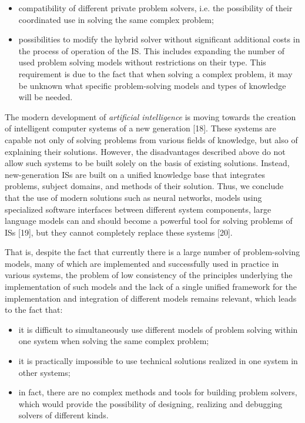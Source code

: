 \documentclass[10pt, a4paper]{article}
\begin{document}
\begin{multicols}{2}
\begin{itemize}
 \setlength{\baselineskip}{0.9\baselineskip}
     \item  compatibility of different private problem solvers, i.e. the possibility of their coordinated use in solving the same complex problem;
     \item possibilities to modify the hybrid solver without significant additional costs in the process of operation of the IS. This includes expanding the number of used problem solving models without restrictions on their type. This requirement is due to the fact that when solving a complex problem, it may be unknown what specific problem-solving models and types of knowledge will be needed.
 \end{itemize}
\par The modern development of \textit{artificial intelligence} is moving towards the creation of intelligent computer systems of a new generation [18]. These systems are capable not only of solving problems from various fields of knowledge, but also of explaining their solutions. However, the disadvantages described above do not allow such systems to be built solely on the basis of existing solutions. Instead, new-generation ISs are built on a unified knowledge base that integrates problems, subject domains, and methods of their solution. Thus, we conclude that the use of modern solutions such as neural networks, models using specialized software interfaces between different system components, large language models can and should become a powerful tool for solving problems of ISs [19], but they cannot completely replace these systems [20].
\par  That is, despite the fact that currently there is a large number of problem-solving models, many of which are implemented and successfully used in practice in various systems, the problem of low consistency of the principles underlying the implementation of such models and the lack of a single unified framework for the implementation and integration of different models remains relevant, which leads to the fact that:
\begin{itemize}
\setlength{\baselineskip}{0.9\baselineskip}
    \item  it is difficult to simultaneously use different models of problem solving within one system when solving the same complex problem;
    \item  it is practically impossible to use technical solutions realized in one system in other systems;
    \item  in fact, there are no complex methods and tools for building problem solvers, which would provide the possibility of designing, realizing and debugging solvers of different kinds.

\end{itemize}
\end{multicols}
\end{document}
